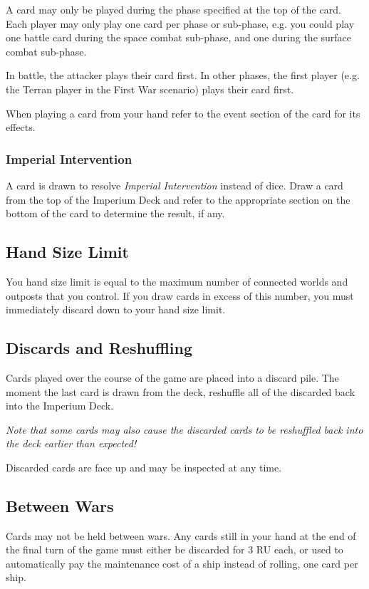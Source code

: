 A card may only be played during the phase specified at the top of the card. Each player may only play one card per phase or sub-phase, e.g. you could play one battle card during the space combat sub-phase, and one during the surface combat sub-phase.

In battle, the attacker plays their card first. In other phases, the first player (e.g. the Terran player in the First War scenario) plays their card first.

When playing a card from your hand refer to the event section of the card for its effects.

\subsubsection{Imperial Intervention}

A card is drawn to resolve \textit{Imperial Intervention} instead of dice. Draw a card from the top of the Imperium Deck and refer to the appropriate section on the bottom of the card to determine the result, if any.

\subsection{Hand Size Limit}

You hand size limit is equal to the maximum number of connected worlds and outposts that you control. If you draw cards in excess of this number, you must immediately discard down to your hand size limit.

\subsection{Discards and Reshuffling}

Cards played over the course of the game are placed into a discard pile. The moment the last card is drawn from the deck, reshuffle all of the discarded back into the Imperium Deck.

\textit{Note that some cards may also cause the discarded cards to be reshuffled back into the deck earlier than expected!}

Discarded cards are face up and may be inspected at any time.

\subsection{Between Wars}

Cards may not be held between wars. Any cards still in your hand at the end of the final turn of the game must either be discarded for 3 RU each, or used to automatically pay the maintenance cost of a ship instead of rolling, one card per ship.

